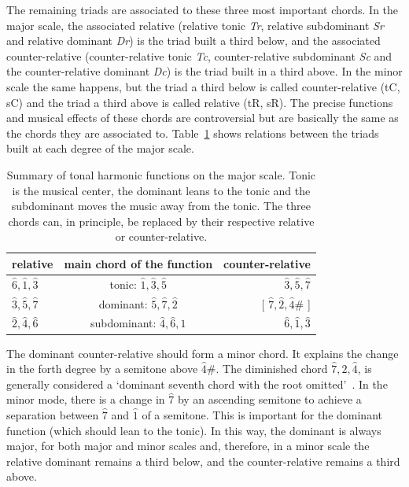 \documentclass[format=acmsmall, review=false, screen=true]{acmart}
\begin{document}
The remaining triads are associated to these three most important chords. In the major scale, the associated relative (relative tonic \textit{Tr}, relative
subdominant \textit{Sr} and relative dominant \textit{Dr}) is the triad built a third below, and the associated counter-relative (counter-relative tonic \textit{Tc}, counter-relative subdominant \textit{Sc} and the counter-relative dominant \textit{Dc}) is the triad built in a third above. In the minor scale the same happens, but the triad a third below is called counter-relative (tC, sC) and the triad a third above is called relative (tR,
sR). The precise functions and musical effects of these chords are
controversial but are basically the same as the chords they are associated to.
Table~\ref{tab:harmonia} shows relations between the triads built at each degree of the major scale.

\begin{table}[htp!]
\centering
\caption{Summary of tonal harmonic functions on the major scale.
Tonic is the musical center, the dominant leans to the tonic and the subdominant moves the music away from
the tonic. The three chords can, in principle, be replaced by their
respective relative or counter-relative.}
\begin{tabular}{l | c | r}
relative & main chord of the function & counter-relative \\\hline\hline
$\hat{6},\hat{1},\hat{3}$ & tonic:       $\hat{1},\hat{3},\hat{5}$ & $\hat{3}, \hat{5},      \hat{7}$ \\
$\hat{3},\hat{5},\hat{7}$ & dominant:    $\hat{5},\hat{7},\hat{2}$ & [ $\hat{7},\hat{2},\hat{4}\#$ ] \\
$\hat{2},\hat{4},\hat{6}$ & subdominant: $\hat{4},\hat{6},\hat{1}$ & $\hat{6},\hat{1},       \hat{3}$
\end{tabular}
\label{tab:harmonia}
\end{table}

The dominant counter-relative should form a minor chord. It explains the change in the forth degree by a semitone above $\hat{4}\#$. The diminished chord
$\hat{7},\hat{2},\hat{4}$, is generally considered a `dominant seventh chord with the root omitted'~\cite{Koellheuteur}.
In the minor mode, there is a change in $\hat{7}$ by an ascending semitone to achieve a separation between $\hat{7}$ and $\hat{1}$ of a semitone. This is important for the dominant function (which should lean to the tonic). In this way, the dominant is always major, for both major and minor scales and, therefore, in a minor scale the relative dominant remains a third below, and the counter-relative remains a third above.
\end{document}
